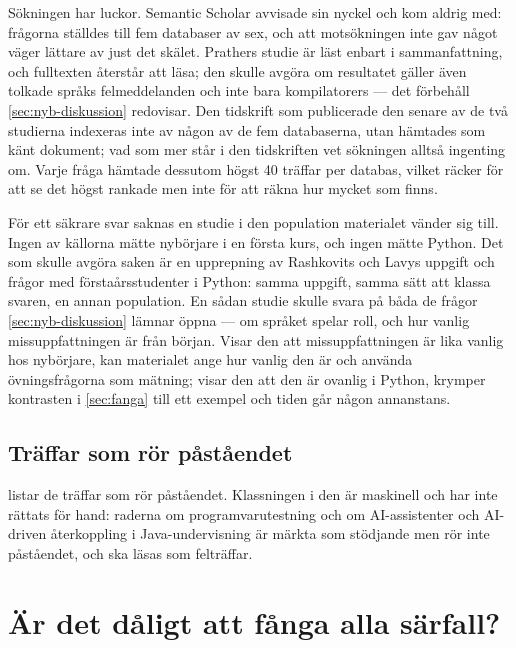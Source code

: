 Sökningen har luckor.  Semantic Scholar avvisade sin
nyckel och kom aldrig med: frågorna ställdes till fem databaser av sex,
och att motsökningen inte gav något väger lättare av just det skälet.
Prathers studie är läst enbart i
sammanfattning\autocite{Prather2017CEM}, och fulltexten återstår att
läsa; den skulle avgöra om resultatet gäller även tolkade språks
felmeddelanden och inte bara kompilatorers --- det förbehåll
\cref{sec:nyb-diskussion} redovisar.  Den tidskrift som publicerade den
senare av de två studierna indexeras inte av någon av de fem
databaserna, utan hämtades som känt dokument; vad som mer står i den
tidskriften vet sökningen alltså ingenting om.  Varje fråga hämtade
dessutom högst 40 träffar per databas, vilket räcker för att se det
högst rankade men inte för att räkna hur mycket som finns.

För ett säkrare svar saknas en studie i den population materialet
vänder sig till.  Ingen av källorna mätte nybörjare i en första kurs,
och ingen mätte Python.  Det som skulle avgöra saken är en upprepning
av Rashkovits och Lavys uppgift och frågor med förstaårsstudenter i
Python: samma uppgift, samma sätt att klassa svaren, en annan
population.  En sådan studie skulle svara på båda de frågor
\cref{sec:nyb-diskussion} lämnar öppna --- om språket spelar roll, och
hur vanlig missuppfattningen är från början.  Visar den att
missuppfattningen är lika vanlig hos nybörjare, kan materialet ange hur
vanlig den är och använda övningsfrågorna som mätning; visar den att
den är ovanlig i Python, krymper kontrasten i \cref{sec:fanga} till ett
exempel och tiden går någon annanstans.

\section{Träffar som rör påståendet}

 listar de träffar som rör påståendet.
Klassningen i den är maskinell och har inte rättats för hand: raderna om
programvarutestning och om AI-assistenter och AI-driven återkoppling i
Java-undervisning är märkta som stödjande men rör inte påståendet, och
ska läsas som felträffar.



\chapter{Är det dåligt att fånga alla särfall?}
\label{app:catchall}

